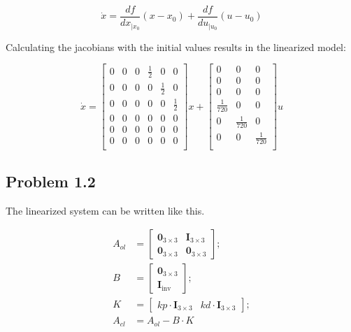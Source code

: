 \begin{equation}
    \dot{x} = \frac{df}{dx_{|x_0}}(x-x_0) + \frac{df}{du_{|u_0}}(u-u_0)
\end{equation}

Calculating the jacobians with the initial values results in the linearized model:

\begin{equation}
    \dot{x} = 
    \begin{bmatrix}
        0 & 0 & 0 & \frac{1}{2}  & 0 & 0 \\
        0 & 0 & 0 & 0 & \frac{1}{2}  & 0 \\
        0 & 0 & 0 & 0 & 0 & \frac{1}{2}  \\
        0 & 0 & 0 & 0 & 0 & 0 \\
        0 & 0 & 0 & 0 & 0 & 0 \\
        0 & 0 & 0 & 0 & 0 & 0 \\
    \end{bmatrix}
    x + 
    \begin{bmatrix}
        0 & 0 & 0 \\
        0 & 0 & 0 \\
        0 & 0 & 0 \\
        \frac{1}{720} & 0 & 0 \\
        0 & \frac{1}{720}  & 0 \\
        0 & 0 & \frac{1}{720} \\
    \end{bmatrix}
    u
\end{equation}








\subsection*{Problem 1.2}

The linearized system can be written like this. 

\begin{align*}
A_{ol} &= \begin{bmatrix}
    \mathbf{0}_{3\times3} & \mathbf{I}_{3\times3} \\
    \mathbf{0}_{3\times3} & \mathbf{0}_{3\times3}
\end{bmatrix}; \\
B &= \begin{bmatrix}
    \mathbf{0}_{3\times3} \\
    \mathbf{I}_{\text{inv}}
\end{bmatrix}; \\
K &= \begin{bmatrix}
    kp\cdot\mathbf{I}_{3\times3} & kd\cdot\mathbf{I}_{3\times3}
\end{bmatrix}; \\
A_{cl} &= A_{ol} - B\cdot K
\end{align*}

